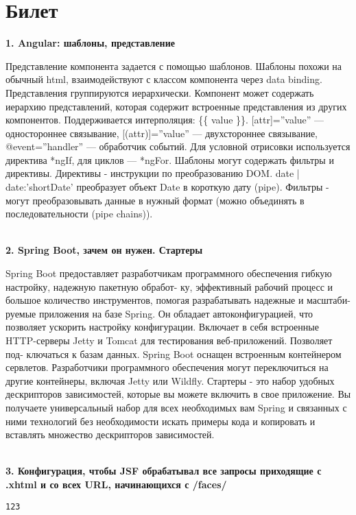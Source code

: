 \documentclass{article}
\newcommand{\bil}[5]{%
        \section{Билет}
        \textbf{1. #1}

        #4
        \\
        \textbf{2. #2}
        
        #5
        \\
        \textbf{3. #3}
}
\begin{document}
\bil{Angular: шаблоны, представление }
{Spring Boot, зачем он нужен. Стартеры}
{Конфигурация, чтобы JSF обрабатывал все запросы приходящие с .xhtml и со всех URL, начинающихся с /faces/}{
    Представление компонента задается с помощью шаблонов. 
    Шаблоны похожи на обычный html, взаимодействуют с классом компонента через data binding. 
    Представления группируются иерархически. Компонент может содержать иерархию представлений, которая содержит встроенные представления из других компонентов. 
    Поддерживается интерполяция: \{\{ value \}\}. [attr]=”value” — одностороннее связывание, [(attr)]=”value” — двухстороннее связывание, @event=”handler” — обработчик событий. 
    Для условной отрисовки используется директива *ngIf, для циклов — *ngFor. 
    Шаблоны могут содержать фильтры и директивы. 
    Директивы - инструкции по преобразованию DOM. 
    {{ date | date:'shortDate' }} преобразует объект Date в короткую дату (pipe).
    Фильтры - могут преобразовывать данные в нужный формат (можно объединять в последовательности (pipe chains)).
}{
    Spring Boot предоставляет разработчикам программного обеспечения гибкую настройку, надежную пакетную обработ-
ку, эффективный рабочий процесс и большое количество инструментов, помогая разрабатывать надежные и масштаби-
руемые приложения на базе Spring. Он обладает автоконфигурацией, что позволяет ускорить настройку конфигурации.
Включает в себя встроенные HTTP-серверы Jetty и Tomcat для тестирования веб-приложений. Позволяет под-
ключаться к базам данных.
Spring Boot оснащен встроенным контейнером сервлетов. Разработчики
программного обеспечения могут переключиться на другие контейнеры, включая Jetty или Wildfly.
Стартеры - это набор удобных дескрипторов зависимостей, которые вы можете включить в свое приложение. Вы получаете универсальный набор для всех необходимых вам Spring и связанных с ними технологий без необходимости искать примеры кода и копировать и вставлять множество дескрипторов зависимостей.
}
\begin{lstlisting}[frame=single, basicstyle=\ttfamily, breaklines=true, breakatwhitespace=true, postbreak=\mbox{\textcolor{red}{$\hookrightarrow$}\space}]
123
\end{lstlisting}
\end{document}
